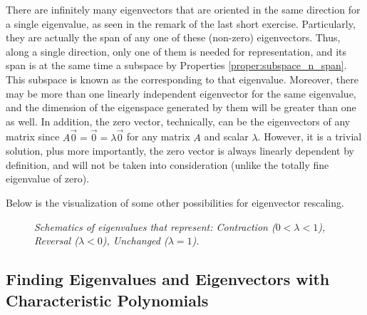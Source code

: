 There are infinitely many eigenvectors that are oriented in the same direction for a single eigenvalue, as seen in the remark of the last short exercise. Particularly, they are actually the span of any one of these (non-zero) eigenvectors. Thus, along a single direction, only one of them is needed for representation, and its span is at the same time a subspace by Properties \ref{proper:subspace_n_span}. This subspace is known as the  corresponding to that eigenvalue. Moreover, there may be more than one linearly independent eigenvector for the same eigenvalue, and the dimension of the eigenspace generated by them will be greater than one as well. In addition, the zero vector, technically, can be the eigenvectors of any matrix since $A\vec{0} = \vec{0} = \lambda\vec{0}$ for any matrix $A$ and scalar $\lambda$. However, it is a trivial solution, plus more importantly, the zero vector is always linearly dependent by definition, and will not be taken into consideration (unlike the totally fine eigenvalue of zero).\par
Below is the visualization of some other possibilities for eigenvector rescaling.
\begin{figure}[h!]
\centering
{}
\caption{\textit{Schematics of eigenvalues that represent: Contraction ($0 < \lambda < 1$), Reversal ($\lambda < 0$), Unchanged ($\lambda = 1$).}}
\end{figure}

\subsection{Finding Eigenvalues and Eigenvectors with Characteristic Polynomials}

